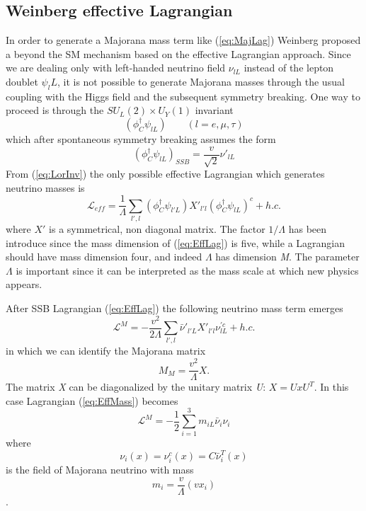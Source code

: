 \documentclass{subnucbo}
\begin{document}
\subsection{Weinberg effective Lagrangian}
In order to generate a Majorana mass term like (\ref{eq:MajLag}) Weinberg proposed a beyond the SM mechanism based on the effective Lagrangian approach.
Since we are dealing only with left-handed neutrino field $\nu_{lL}$ instead of the lepton doublet $\psi_lL$, it is not possible to generate Majorana masses through the usual coupling with the Higgs field and the subsequent symmetry breaking. 
One way to proceed is through the $SU_L(2)\times U_Y(1)$ invariant
\begin{equation}
\label{eq:LorInv}
(\phi_C^{\dagger}\psi_{lL})\qquad(l=e, \mu, \tau)
\end{equation}
which after spontaneous symmetry breaking assumes the form
\begin{equation}
(\phi_C^{\dagger}\psi_{lL})_{SSB}=\frac{v}{\sqrt{2}}\nu'_{lL}
\end{equation}
From (\ref{eq:LorInv}) the only possible effective Lagrangian which generates neutrino masses is
\begin{equation}
\label{eq:EffLag}
\mathcal{L}_{eff}=\frac{1}{\Lambda}\sum_{l',l}(\phi_C^{\dagger}\psi_{l'L})X'_{l'l}(\phi_C^{\dagger}\psi_{lL})^c+h.c.
\end{equation}
where $X'$ is a symmetrical, non diagonal matrix.
The factor $1/\Lambda$ has been introduce since the mass dimension of (\ref{eq:EffLag}) is five, while a Lagrangian should have mass dimension four, and indeed $\Lambda$ has dimension \emph{M}.
The parameter $\Lambda$ is important since it can be interpreted as the mass scale at which new physics appears.

After SSB Lagrangian (\ref{eq:EffLag}) the following neutrino mass term emerges
\begin{equation}
\label{eq:EffMass}
\mathcal{L}^M=-\frac{v^2}{2\Lambda}\sum_{l',l}\bar{\nu}'_{l'L}X'_{l'l}\nu_{lL}^{'c}+h.c.
\end{equation}
in which we can identify the Majorana matrix
\begin{equation}
M_M=\frac{v^2}{\Lambda}X. 
\end{equation}
The matrix \emph{X} can be diagonalized by the unitary matrix \emph{U}: $X=UxU^T$. %
In this case Lagrangian (\ref{eq:EffMass}) becomes
\begin{equation}
\mathcal{L}^M=-\frac{1}{2}\sum_{i=1}^3m_{iL}\bar{\nu}_i\nu_i
\end{equation}
where
\begin{equation}
\label{eq:nuC}
\nu_i(x)=\nu_i^c(x)=C\bar{\nu}_i^T(x)
\end{equation}
is the field of  Majorana neutrino with mass 
\begin{equation}
\label{eq:neutMass}
m_{i}=\frac{v}{\Lambda}(vx_i)
\end{equation}.
\end{document}
